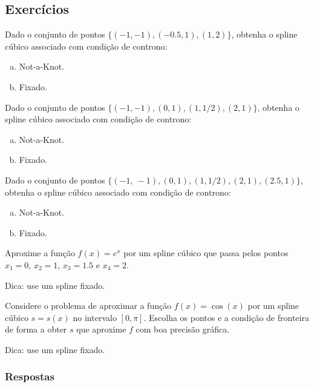 \subsection{Exercícios}

\begin{exer}
  Dado o conjunto de pontos $\{(-1, -1), (-0.5, 1), (1, 2)\}$, obtenha o spline cúbico associado com condição de controno:
  \begin{enumerate}[a)]
  \item Not-a-Knot.
  \item Fixado.
  \end{enumerate}
\end{exer}

\begin{exer}
  Dado o conjunto de pontos $\{(-1, -1), (0, 1), (1, 1/2), (2, 1)\}$, obtenha o spline cúbico associado com condição de controno:
  \begin{enumerate}[a)]
  \item Not-a-Knot.
  \item Fixado.
  \end{enumerate}
\end{exer}

\begin{exer}
  Dado o conjunto de pontos $\{(-1,~-1), (0, 1), (1, 1/2), (2, 1), (2.5, 1)\}$, obtenha o spline cúbico associado com condição de controno:
  \begin{enumerate}[a)]
  \item Not-a-Knot.
  \item Fixado.
  \end{enumerate}
\end{exer}

\begin{exer}
  Aproxime a função $f(x)=e^{x}$ por um spline cúbico que passa pelos pontos $x_1=0$, $x_2=1$, $x_3=1.5$ e $x_4=2$.
\end{exer}
\begin{resp}
  Dica: use um spline fixado.
\end{resp}

\begin{exer}
  Considere o problema de aproximar a função $f(x) = \cos(x)$ por um spline cúbico $s = s(x)$ no intervalo $[0, \pi]$. Escolha os pontos e a condição de fronteira de forma a obter $s$ que aproxime $f$ com boa precisão gráfica.
\end{exer}
\begin{resp}
  Dica: use um spline fixado.
\end{resp}

\ifisbook
\subsubsection{Respostas}
\shipoutAnswer
\fi

